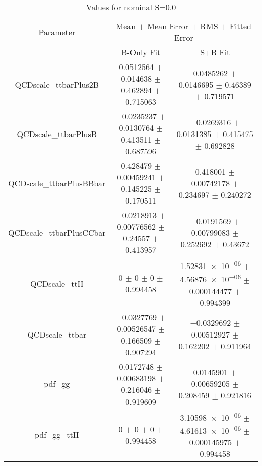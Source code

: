 \begin{table}
\centering
\caption{Values for nominal S=0.0}
\begin{tabular}{ccc}
\toprule
Parameter & \multicolumn{2}{c}{Mean $\pm$ Mean Error $\pm$ RMS $\pm$ Fitted Error}\\
 & B-Only Fit & S+B Fit\\
\midrule
QCDscale\_ttbarPlus2B & \num{0.0512564} $\pm$ \num{0.014638} $\pm$ \num{0.462894} $\pm$ \num{0.715063} & \num{0.0485262} $\pm$ \num{0.0146695} $\pm$ \num{0.46389} $\pm$ \num{0.719571}\\
QCDscale\_ttbarPlusB & \num{-0.0235237} $\pm$ \num{0.0130764} $\pm$ \num{0.413511} $\pm$ \num{0.687596} & \num{-0.0269316} $\pm$ \num{0.0131385} $\pm$ \num{0.415475} $\pm$ \num{0.692828}\\
QCDscale\_ttbarPlusBBbar & \num{0.428479} $\pm$ \num{0.00459241} $\pm$ \num{0.145225} $\pm$ \num{0.170511} & \num{0.418001} $\pm$ \num{0.00742178} $\pm$ \num{0.234697} $\pm$ \num{0.240272}\\
QCDscale\_ttbarPlusCCbar & \num{-0.0218913} $\pm$ \num{0.00776562} $\pm$ \num{0.24557} $\pm$ \num{0.413957} & \num{-0.0191569} $\pm$ \num{0.00799083} $\pm$ \num{0.252692} $\pm$ \num{0.43672}\\
QCDscale\_ttH & \num{0} $\pm$ \num{0} $\pm$ \num{0} $\pm$ \num{0.994458} & \num{1.52831e-06} $\pm$ \num{4.56876e-06} $\pm$ \num{0.000144477} $\pm$ \num{0.994399}\\
QCDscale\_ttbar & \num{-0.0327769} $\pm$ \num{0.00526547} $\pm$ \num{0.166509} $\pm$ \num{0.907294} & \num{-0.0329692} $\pm$ \num{0.00512927} $\pm$ \num{0.162202} $\pm$ \num{0.911964}\\
pdf\_gg & \num{0.0172748} $\pm$ \num{0.00683198} $\pm$ \num{0.216046} $\pm$ \num{0.919609} & \num{0.0145901} $\pm$ \num{0.00659205} $\pm$ \num{0.208459} $\pm$ \num{0.921816}\\
pdf\_gg\_ttH & \num{0} $\pm$ \num{0} $\pm$ \num{0} $\pm$ \num{0.994458} & \num{3.10598e-06} $\pm$ \num{4.61613e-06} $\pm$ \num{0.000145975} $\pm$ \num{0.994458}\\
\bottomrule
\end{tabular}
\end{table}